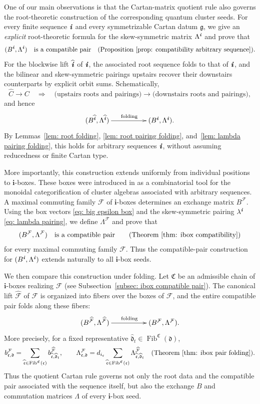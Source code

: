 \documentclass[12pt, leqno]{amsart}
\numberwithin{equation}{section}
\theoremstyle{plain}
\theoremstyle{definition}
\newcommand{\g}{\mathfrak{g}}
\newcommand{\La}{\Lambda}
\newcommand{\ii}{ \textbf{\textit{i}}}
\newcommand{\Fib}{\operatorname{Fib}}
\newcommand{\hii}{{\widehat{\ii}}}
\newcommand{\frakC}{\mathfrak{C}}
\newcommand{\frakc}{\mathfrak{c}}
\newcommand{\frakd}{\mathfrak{d}}
\newcommand{\hfrakc}{\widehat{\frakc}}
\newcommand{\hfrakd}{\widehat{\frakd}}
\newcommand{\bfi}{\mathbf{i}}
\newcommand{\calF}{\mathcal{F}}
\newcommand{\hcalF}{{\widehat{\calF}}}
\begin{document}
One of our main observations is that the Cartan-matrix quotient rule
also governs the root-theoretic construction of the corresponding
quantum cluster seeds.
For every finite sequence $\ii$ and every symmetrizable
Cartan datum $\g$, we
give an \emph{explicit} root-theoretic formula for the
skew-symmetric matrix $\Lambda^\ii$ and prove that
\[
(B^\ii,\Lambda^\ii)
\quad\text{is a compatible pair} \quad
\text{(Proposition~\ref{prop: compatibility arbitrary sequence}).}
\]
For the blockwise lift $\hii$ of $\ii$, the associated root sequence
folds to that of $\ii$, and the bilinear and skew-symmetric pairings
upstairs recover their downstairs counterparts by explicit orbit sums.
Schematically,
\[
\widehat C\longrightarrow C
\quad\Longrightarrow\quad
\bigl(\text{upstairs roots and pairings}\bigr)
\longrightarrow
\bigl(\text{downstairs roots and pairings}\bigr),
\]
and hence
\[
\xymatrix@C=5em{
(B^{\hii},\Lambda^{\hii})
\ar[r]^{\text{folding}}
&
(B^\ii,\Lambda^\ii).
}
\]
By Lemmas~\ref{lem: root folding}, \ref{lem: root pairing folding},
and~\ref{lem: lambda pairing folding}, this holds for arbitrary
sequences $\ii$, without assuming reducedness or finite Cartan type.

More importantly, this construction extends uniformly from individual
positions to $\bfi$-boxes. These boxes were introduced in
\cite{KKOP24B,KK24} as a combinatorial tool for the monoidal
categorification of cluster algebras associated with arbitrary
sequences. A maximal commuting family $\calF$ of $\bfi$-boxes
determines an exchange matrix $B^\calF$. Using the box vectors \eqref{eq: big epsilon box} and the
skew-symmetric pairing $\lambda^\ii$ \eqref{eq: lambda pairing}, we define $\Lambda^\calF$ and
prove that
\[
(B^\calF,\Lambda^\calF)
\quad\text{is a compatible pair} \qquad\text{(Theorem~\ref{thm: ibox compatibility})}
\]
for every maximal commuting family $\calF$. Thus the compatible-pair
construction for $(B^\ii,\Lambda^\ii)$ extends naturally to all
$\bfi$-box seeds.

We then compare this construction under folding.
Let $\frakC$ be an admissible chain of $\bfi$-boxes realizing
$\calF$ (see Subsection~\ref{subsec: ibox compatible pair}). 
The canonical lift
$\hcalF$ of $\calF$ is organized into  fibers over the boxes of $\calF$, and the entire compatible pair folds along these fibers:
\[
\xymatrix@C=5em{
(B^{\hcalF},\Lambda^{\hcalF})
\ar[r]^{\text{folding}}
&
(B^\calF,\Lambda^\calF).
}
\]
More precisely, for a fixed representative
$\hfrakd_t\in\Fib^{\frakC}(\frakd)$,
\[
b^\calF_{\frakc,\frakd}
=
\sum_{\hfrakc\in\Fib^{\frakC}(\frakc)}
b^{\hcalF}_{\hfrakc,\hfrakd_t},
\qquad
\Lambda^\calF_{\frakc,\frakd}
=
d_{i_\frakc}
\sum_{\hfrakc\in\Fib^{\frakC}(\frakc)}
\Lambda^{\hcalF}_{\hfrakc,\hfrakd_t} \quad \text{(Theorem~\ref{thm: ibox pair folding})}.
\]
Thus the quotient Cartan rule governs not only the root data and the
compatible pair associated with the sequence itself, but also the
exchange $B$ and commutation matrices $\La$ of every $\bfi$-box seed.
\end{document}
